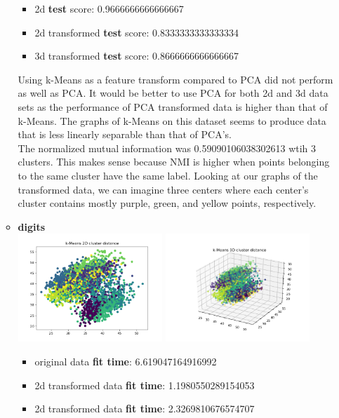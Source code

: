 \documentclass[12pt]{article}
\begin{document}
\begin{enumerate}[leftmargin=\parindent,align=left,labelwidth=\parindent,noitemsep]
\begin{itemize}[noitemsep,topsep=1pt]
\begin{itemize}
        \item 2d \textbf{test} score: 0.9666666666666667
        \item 2d transformed \textbf{test} score: 0.8333333333333334
        \item 3d transformed \textbf{test} score: 0.8666666666666667 \\
    \end{itemize}
    Using k-Means as a feature transform compared to PCA did not perform as well as PCA. It would be better to use PCA for both 2d and 3d data sets as the performance of PCA transformed data is higher than that of k-Means. The graphs of k-Means on this dataset seems to produce data that is less linearly separable than that of PCA's. \\
    The normalized mutual information was 0.59090106038302613 wtih 3 clusters. This makes sense because NMI is higher when points belonging to the same cluster have the same label. Looking at our graphs of the transformed data, we can imagine three centers where each center's cluster contains mostly purple, green, and yellow points, respectively. 
    \item \textbf{digits} \\
    \includegraphics[width=0.45\textwidth]{kmeans_digits_2d} \includegraphics[width=0.45\textwidth]{kmeans_digits_3d} \\
    \begin{itemize}
        \item original data \textbf{fit time}: 6.619047164916992
        \item 2d transformed data \textbf{fit time}: 1.1980550289154053
        \item 2d transformed data \textbf{fit time}: 2.3269810676574707 \\


\end{itemize}
\end{itemize}
\end{enumerate}
\end{document}
